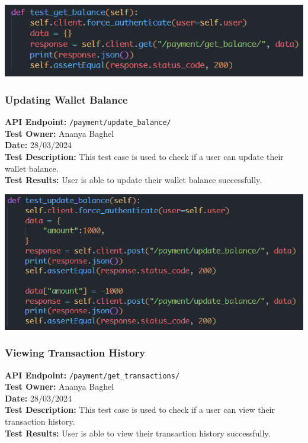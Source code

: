 \documentclass[11pt]{article}
\begin{document}
\begin{center}
    \includegraphics[scale=0.7]{unit_testing_codes/get_balance.png}
\end{center}

\subsubsection{Updating Wallet Balance}
\textbf{API Endpoint: } \texttt{/payment/update\_balance/} \\
\textbf{Test Owner: } Ananya Baghel \\
\textbf{Date: } 28/03/2024 \\
\textbf{Test Description: } This test case is used to check if a user can update their wallet balance. \\
\textbf{Test Results: } User is able to update their wallet balance successfully.\\

\begin{center}
    \includegraphics[scale=0.7]{unit_testing_codes/update_balance.png}
\end{center}

\subsubsection{Viewing Transaction History}
\textbf{API Endpoint: } \texttt{/payment/get\_transactions/} \\
\textbf{Test Owner: } Ananya Baghel \\
\textbf{Date: } 28/03/2024 \\
\textbf{Test Description: } This test case is used to check if a user can view their transaction history. \\
\textbf{Test Results: } User is able to view their transaction history successfully.\\
\end{document}
